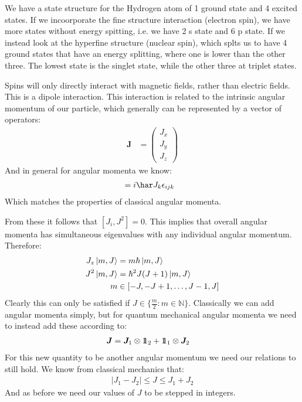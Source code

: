 We have a state structure for the Hydrogen atom of 1 ground state and 4 excited states. If we incoorporate the fine structure interaction (electron spin), we have more states without energy spitting, i.e. we have 2 s state and 6 p state.
If we instead look at the hyperfine structure (nuclear spin), which splts us to have 4 ground states that have an energy splitting, where one is lower than the other three. The lowest state is the singlet state, while the other three at triplet states.

Spins will only directly interact with magnetic fields, rather than electric fields. This is a dipole interaction. This interaction is related to the intrinsic angular momentum of our particle, which generally can be represented by a vector of operators:
\begin{align*}
	\bm{J} &= \begin{pmatrix}
		J_x \\
		J_y \\
		J_z
		  \end{pmatrix}
\end{align*}
And in general for angular momenta we know:
\begin{align*}
	[J_i,J_j] &= i\har J_k \epsilon_{ijk}
\end{align*}
Which matches the properties of classical angular momenta. 

From these it follows that $[J_i,J^2] = 0$. This implies that overall angular momenta has simultaneous eigenvalues with any individual angular momentum. Therefore:
\begin{align*}
	J_z \ket{m,J} &= m\hbar\ket{m,J} \\
	J^2\ket{m,J} &= \hbar^2 J(J+1)\ket{m,J} \\
	m &\in [-J, -J +1,\ldots, J-1, J]
\end{align*}
Clearly this can only be satisfied if $J \in \{\frac{m}{2} :m\in \mathbb{N}\}$. Classically we can add angular momenta simply, but for quantum mechanical angular momenta we need to instead add these according to:
\begin{align*}
	\bm{J} &= \bm{J}_1 \otimes 1\!\!1_2 + 1\!\!1_1 \otimes \bm{J}_2
\end{align*}
For this new quantity to be another angular momentum we need our relations to still hold. We know from classical mechanics that:
\begin{align*}
	|J_1 - J_2| \leq J \leq J_1 + J_2
\end{align*}
And as before we need our values of $J$ to be stepped in integers.

